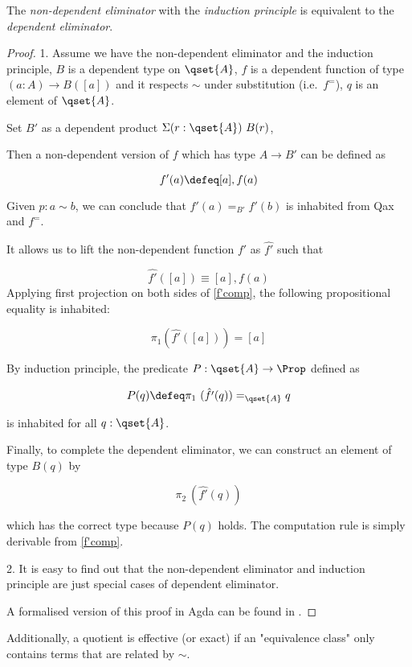 \begin{proposition}\label{elim-equiv}
The \emph{non-dependent eliminator} with the \emph{induction principle} is equivalent to the \emph{dependent eliminator}.
\end{proposition}
\begin{proof}
1. Assume we have the non-dependent eliminator and the induction principle, $B$ is a dependent type on $\qset{A}$, $f$ is a dependent function of type $(a : A) \to B([ a ])$ and it respects $\sim$ under substitution (i.e.\ $f^=$), $q$ is an element of $\qset{A}$.

Set $B'$ as a dependent product $\Sigma (r : \qset{A}) ~B(r)$,

Then a non-dependent version of $f$ which has type $A \to B'$ can be defined as

$$f' (a) \defeq [ a ] , f (a)$$

Given $p : a \sim b$, we can conclude that $f'(a) =_{B'} f'(b)$ is inhabited from Qax and $f^=$.

It allows us to lift the non-dependent function $f'$ as $\hat{f'}$ such that 

\begin{equation}\label{f'comp}
\hat{f'} ([ a ]) \equiv [ a ] , f (a)
\end{equation}
Applying first projection on both sides of \ref{f'comp}, the following propositional equality is inhabited:

 $$\pi_1 (\hat{f'}([ a ])) = [ a ]$$

By induction principle, the predicate $P : \qset{A} \to \Prop$ defined as

$$P(q) \defeq \pi_1 ~(\hat{f'}(q)) =_{\qset{A}} q$$

is inhabited for all $q : \qset{A}$.

Finally, to complete the dependent eliminator, we can construct an element of type $B(q)$ by

$$\pi_2 ~(\hat{f'}(q))$$

which has the correct type because $P(q)$ holds. The computation rule is simply derivable from \ref{f'comp}.

2. It is easy to find out that the non-dependent eliminator and induction principle are just special cases of dependent eliminator.

A formalised version of this proof in Agda can be found in .
\end{proof}


Additionally, a quotient is effective (or exact) if an "equivalence class" only contains terms that are related by $\sim$.

